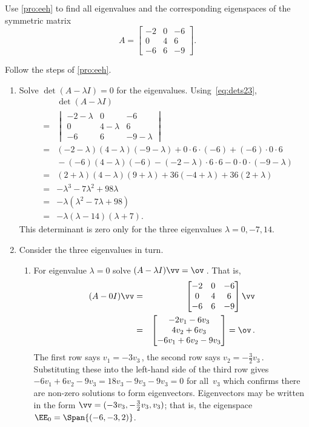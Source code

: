 \begin{example} \label{eg:3x3hande}
Use \autoref{pro:eeh} to find all eigenvalues and the corresponding eigenspaces of the symmetric matrix
\begin{equation*}
A=\begin{bmatrix} -2&0&-6\\0&4&6\\-6&6&-9 \end{bmatrix}.
\end{equation*}

\begin{solution} 
Follow the steps of \autoref{pro:eeh}.
\begin{enumerate}
\item Solve \(\det(A-\lambda I)=0\) for the eigenvalues.
Using~\eqref{eq:dets23},
\begin{eqnarray*}&&
\det(A-\lambda I)
\\&=& \begin{vmatrix} -2-\lambda&0&-6\\0&4-\lambda&6\\-6&6&-9-\lambda \end{vmatrix}
\\&=&(-2-\lambda)(4-\lambda)(-9-\lambda)+0\cdot6\cdot(-6)+(-6)\cdot0\cdot 6
\\&&{}
-(-6)(4-\lambda)(-6)-(-2-\lambda)\cdot6\cdot6-0\cdot0\cdot(-9-\lambda)
\\&=&(2+\lambda)(4-\lambda)(9+\lambda)+36(-4+\lambda)+36(2+\lambda)
\\&=&-\lambda^3-7\lambda^2+98\lambda
\\&=&-\lambda(\lambda^2-7\lambda+98)
\\&=&-\lambda(\lambda-14)(\lambda+7).
\end{eqnarray*}
This determinant is zero only for the three eigenvalues \(\lambda=0,-7,14\).

\item Consider the three eigenvalues in turn.
\begin{enumerate}
\item For eigenvalue \(\lambda=0\) solve \((A-\lambda I)\vv=\ov\)\,.  
That is,
\begin{eqnarray*}
(A-0I)\vv&=&\begin{bmatrix} -2&0&-6\\0&4&6\\-6&6&-9 \end{bmatrix}\vv
\\&=&\begin{bmatrix} -2v_1-6v_3\\4v_2+6v_3\\-6v_1+6v_2-9v_3 \end{bmatrix}=\ov\,.
\end{eqnarray*}
The first row says \(v_1=-3v_3\)\,, the second row says \(v_2=-\frac32v_3\)\,.  
Substituting these into the left-hand side of the third row gives
\(-6v_1+6v_2-9v_3=18v_3-9v_3-9v_3=0\) for all~\(v_3\) which confirms there are non-zero solutions to form eigenvectors.
Eigenvectors may be written in the form \(\vv=(-3v_3,-\frac32v_3,v_3)\); that is, the eigenspace \(\EE_0=\Span\{(-6,-3,2)\}\).


\end{enumerate}
\end{enumerate}
\end{solution}
\end{example}
